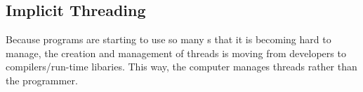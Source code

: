 \subsection{Implicit Threading}\label{subsec:Implicit_Threading}
Because programs are starting to use so many s that it is becoming hard to manage, the creation and management of threads is moving from developers to compilers/run-time libaries.
This way, the computer manages threads rather than the programmer.


